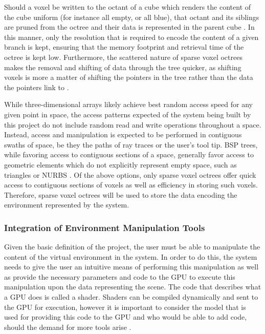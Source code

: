 \documentclass[onecolumn, draftclsnofoot,10pt, compsoc]{IEEEtran}
\newcounter{threesection}[subsubsection]
\begin{document}
Should a voxel be written to the octant of a cube which renders the content of the cube uniform (for instance all empty, or all blue), that octant and its siblings are pruned from the octree and their data is represented in the parent cube \cite{3}.
In this manner, only the resolution that is required to encode the content of a given branch is kept, ensuring that the memory footprint and retrieval time of the octree is kept low.
Furthermore, the scattered nature of sparse voxel octrees makes the removal and shifting of data through the tree quicker, as shifting voxels is more a matter of shifting the pointers in the tree rather than the data the pointers link to \cite{3}.



While three-dimensional arrays likely achieve best random access speed for any given point in space, the access patterns expected of the system being built by this project do not include random read and write operations throughout a space.
Instead, access and manipulation is expected to be performed in contiguous swaths of space, be they the paths of ray traces or the user's tool tip.
BSP trees, while favoring access to contiguous sections of a space, generally favor access to geometric elements which do not explicitly represent empty space, such as triangles or NURBS \cite{5}.
Of the above options, only sparse voxel octrees offer quick access to contiguous sections of voxels as well as efficiency in storing such voxels.
Therefore, sparse voxel octrees will be used to store the data encoding the environment represented by the system.


\subsubsection{Integration of Environment Manipulation Tools}

Given the basic definition of the project, the user must be able to manipulate the content of the virtual environment in the system.
In order to do this, the system needs to give the user an intuitive means of performing this manipulation as well as provide the necessary parameters and code to the GPU to execute this manipulation upon the data representing the scene.
The code that describes what a GPU does is called a shader.
Shaders can be compiled dynamically and sent to the GPU for execution, however it is important to consider the model that is used for providing this code to the GPU and who would be able to add code, should the demand for more tools arise \cite{4}.
\end{document}

